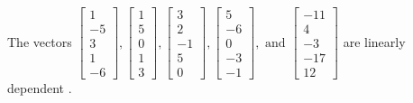 \begin{exercise}
\begin{exerciseStatement}
  \end{exerciseStatement}
  \begin{exerciseAnswer}
   The vectors \(\left[\begin{array}{r}
1 \\
-5 \\
3 \\
1 \\
-6
\end{array}\right] , \left[\begin{array}{r}
1 \\
5 \\
0 \\
1 \\
3
\end{array}\right] , \left[\begin{array}{r}
3 \\
2 \\
-1 \\
5 \\
0
\end{array}\right] , \left[\begin{array}{r}
5 \\
-6 \\
0 \\
-3 \\
-1
\end{array}\right] , \text{ and } \left[\begin{array}{r}
-11 \\
4 \\
-3 \\
-17 \\
12
\end{array}\right]\) are 
  	 linearly dependent  .
  


  \end{exerciseAnswer}
\end{exercise}